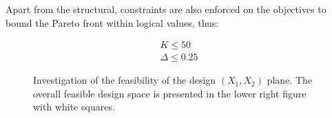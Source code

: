 Apart from the structural, constraints are also enforced on the objectives to bound the Pareto front within logical values, thus:

\begin{eqnarray}
   K \leq 50 \\
   \Delta \leq 0.25 
   \label{obj} 
\end{eqnarray}


\begin{figure}[h!]
\begin{minipage}[b]{1\linewidth}
 \centering
\end{minipage}

\caption{Investigation of the feasibility of the design $(X_1,X_2)$ plane. The overall feasible design space is presented in the lower right figure with white squares.} 
\label{x1x2}
\end{figure}

